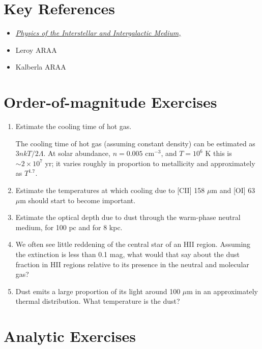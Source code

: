 \section{Key References}

\begin{itemize}
  \item
    \href{http://}
    {\it Physics of the Interstellar and Intergalactic Medium,
      \citet{draine07a}}
\item Leroy ARAA
\item Kalberla ARAA
\end{itemize}

\section{Order-of-magnitude Exercises}

\begin{enumerate} 
\item Estimate the cooling time of hot gas.
\begin{answer}
The cooling time of hot gas (assuming constant density) can be
estimated as $3nkT / 2 \Lambda$. At solar abundance, $n=0.005$
cm$^{-3}$, and $T=10^6$ K this is $\sim 2 \times 10^7$ yr; it varies
roughly in proportion to metallicity and approximately as $T^{1.7}$.
\end{answer}
\item Estimate the temperatures at which cooling due to [CII]
158 $\mu$m and [OI] 63 $\mu$m should start to become important.
\item Estimate the optical depth due to dust through the warm-phase neutral
medium, for 100 pc and for 8 kpc.
\item We often see little reddening of the central star of an HII
region. Assuming the extinction is less than 0.1 mag, what would that
say about the dust fraction in HII regions relative to its presence in
the neutral and molecular gas?
\item Dust emits a large proportion of its light around 100 $\mu$m in
an approximately thermal distribution. What temperature is the dust?
\end{enumerate}   

\section{Analytic Exercises}

